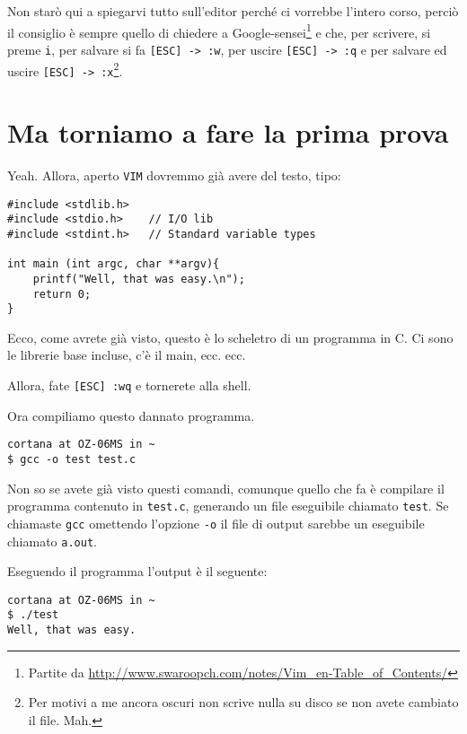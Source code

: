 \documentclass[a4paper]{memoir}
\begin{document}
        Non starò qui a spiegarvi tutto sull'editor perché ci vorrebbe l'intero corso, perciò il consiglio è sempre
        quello di chiedere a Google-sensei\footnote{Partite da \url{http://www.swaroopch.com/notes/Vim_en-Table_of_Contents/}}
        e che, per scrivere, si preme \texttt{i}, per salvare si fa \texttt{[ESC] -> :w}, per uscire \texttt{[ESC] -> :q} 
        e per salvare ed uscire \texttt{[ESC] -> :x}\footnote{Per motivi a me ancora oscuri non scrive nulla su disco
        se non avete cambiato il file. Mah.}.
        
	\section*{Ma torniamo a fare la prima prova}
		
		Yeah. Allora, aperto \texttt{VIM} dovremmo già avere del testo, tipo:
		
	    \begin{Verbatim}[label={UNF, DAT syntax highlighting (dentro VIM)}]
#include <stdlib.h>
#include <stdio.h>    // I/O lib
#include <stdint.h>   // Standard variable types

int main (int argc, char **argv){
    printf("Well, that was easy.\n");
    return 0;
}
		\end{Verbatim}
		
		Ecco, come avrete già visto, questo è lo scheletro di un programma in C. Ci sono le librerie base incluse,
		c'è il main, ecc. ecc.
		
		Allora, fate \texttt{[ESC] :wq} e tornerete alla shell.
		
		Ora compiliamo questo dannato programma.
		
		\begin{Verbatim}[label={Compilazione, HO!}]
cortana at OZ-06MS in ~
$ gcc -o test test.c
		\end{Verbatim}
		
		Non so se avete già visto questi comandi, comunque quello che fa è compilare il programma contenuto in \texttt{test.c},
		generando un file eseguibile chiamato \texttt{test}. Se chiamaste \texttt{gcc} omettendo l'opzione \texttt{-o}
		il file di output sarebbe un eseguibile chiamato \texttt{a.out}.
		
		Eseguendo il programma l'output è il seguente:
		
		\begin{Verbatim}[label={Hello, World.}]
cortana at OZ-06MS in ~
$ ./test
Well, that was easy.
		\end{Verbatim}
		
\end{document}

